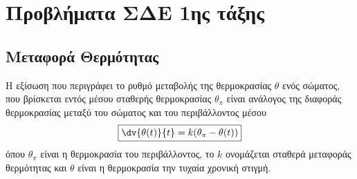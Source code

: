 




\renewcommand{\qedsymbol}{}

\pagestyle{vangelis}





\chapter*{Προβλήματα ΣΔΕ 1ης τάξης}

\section*{Μεταφορά Θερμότητας}

Η εξίσωση που περιγράφει το ρυθμό μεταβολής της θερμοκρασίας $\theta$ ενός σώματος, που 
βρίσκεται εντός μέσου σταθερής θερμοκρασίας $ \theta_{\pi} $ είναι ανάλογος της διαφοράς 
θερμοκρασίας μεταξύ του σώματος και του περιβάλλοντος μέσου
\[
  \boxed{  \dv{\theta(t)}{t} = k (\theta _{\pi} - \theta(t))}
\] 
όπου $ \theta _{\pi} $ είναι η θερμοκρασία του περιβάλλοντος, το $k$ ονομάζεται 
σταθερά μεταφοράς θερμότητας και $\theta$ είναι η θερμοκρασία την τυχαία 
χρονική στιγμή.


